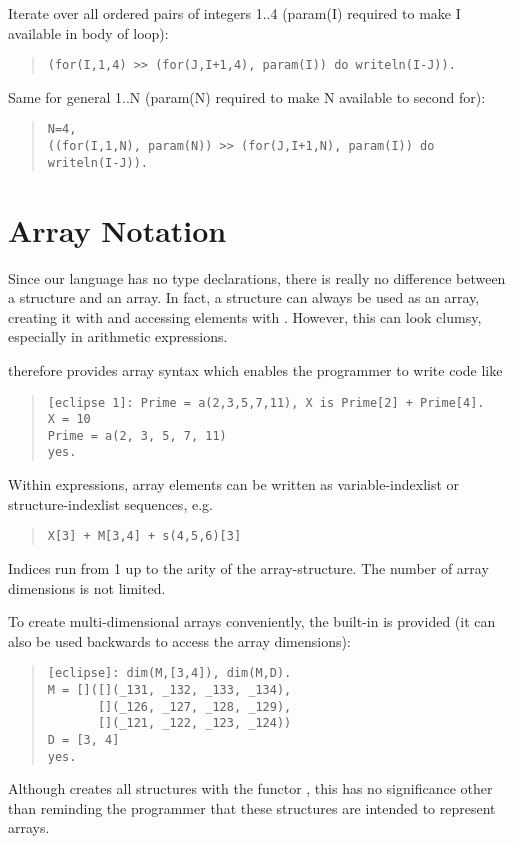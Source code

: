Iterate over all ordered pairs of integers 1..4 (param(I) required to make
I available in body of loop):
\begin{quote}\begin{verbatim}
(for(I,1,4) >> (for(J,I+1,4), param(I)) do writeln(I-J)).
\end{verbatim}\end{quote}

Same for general 1..N (param(N) required to make N available to second for):
\begin{quote}\begin{verbatim}
N=4,
((for(I,1,N), param(N)) >> (for(J,I+1,N), param(I)) do writeln(I-J)).
\end{verbatim}\end{quote}


\section{Array Notation}

Since our language has no type declarations, there is really
no difference between a structure and an array. In fact,
a structure can always be used as an array, creating it with
and accessing elements with
.
However, this can look clumsy, especially in arithmetic expressions.

{\eclipse} therefore provides array syntax which enables the
programmer to write code like
\begin{quote}\begin{verbatim}
[eclipse 1]: Prime = a(2,3,5,7,11), X is Prime[2] + Prime[4].
X = 10
Prime = a(2, 3, 5, 7, 11)
yes.
\end{verbatim}\end{quote}
Within expressions, array elements can be written as variable-indexlist
or structure-indexlist sequences, e.g.
\begin{quote}\begin{verbatim}
X[3] + M[3,4] + s(4,5,6)[3]
\end{verbatim}\end{quote}
Indices run from 1 up to the arity of the array-structure.
The number of array dimensions is not limited.

To create multi-dimensional arrays conveniently, the built-in
is provided (it can also be used backwards to access
the array dimensions):
\begin{quote}\begin{verbatim}
[eclipse]: dim(M,[3,4]), dim(M,D).
M = []([](_131, _132, _133, _134),
       [](_126, _127, _128, _129),
       [](_121, _122, _123, _124))
D = [3, 4]
yes.
\end{verbatim}\end{quote}
Although
creates all structures with the functor \nil , this has
no significance other than reminding the programmer that
these structures are intended to represent arrays.

